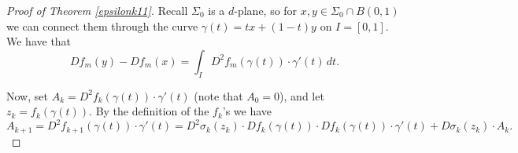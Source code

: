 \documentclass[11pt, twoside, leqno]{article}
\numberwithin{equation}{section}
\theoremstyle{plain}
\theoremstyle{definition}
\newcommand{\R}{\mathbb{R}}
\newcommand{\de}{\partial} %
\begin{document}



\begin{proof}[Proof of Theorem \ref{epsilonk11}]

Recall $\Sigma_0$ is a $d$-plane, so for $x,y \in \Sigma_0 \cap B(0,1)$ we can connect them through the curve $\gamma(t)=tx+(1-t)y$ on $I=[0,1]$.
We have that 
\begin{equation}
Df_m(y)-Df_m(x)= \int_I D^2f_m ( \gamma (t))\cdot \gamma'(t)\,dt.
\end{equation}

Now, set $A_k=D^2f_k ( \gamma (t))\cdot \gamma'(t)$ (note that $A_0=0$), and let $z_k=f_k(\gamma(t))$.
By the definition of the $f_k$'s we have
\begin{equation} \label{am}
A_{k+1}=D^2f_{k+1} ( \gamma (t))\cdot \gamma'(t)= D^2\sigma_k(z_k) \cdot Df_k(\gamma(t)) \cdot Df_k(\gamma(t)) \cdot \gamma'(t) + D\sigma_k(z_k) \cdot A_k.
\end{equation}


\end{proof}
\end{document}
